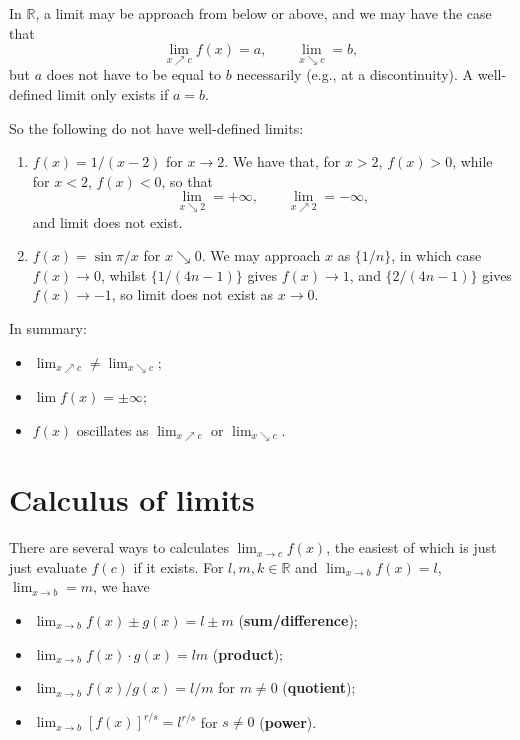 \documentclass[letter-paper]{tufte-book}
\newenvironment{example}[1][Example]{\begin{trivlist}
\item[\hskip \labelsep {\bfseries #1}]}{\end{trivlist}}
\newcommand\Def[1]{\textbf{#1}}
\begin{document}
In $\mathbb{R}$, a limit may be approach from below or above, and we may have 
the case that
\begin{equation*}
  \lim_{x\nearrow c}f(x)=a,\qquad \lim_{x\searrow c}=b,
\end{equation*}
but $a$ does not have to be equal to $b$ necessarily (e.g., at a discontinuity). 
A well-defined limit only exists if $a=b$.
\begin{example}
  So the following do not have well-defined limits:
  \begin{enumerate}
    \item $f(x)=1/(x-2)$ for $x\rightarrow2$. We have that, for $x>2$, $f(x)>0$, 
    while for $x<2$, $f(x)<0$, so that
    \begin{equation*}
      \lim_{x\searrow2}=+\infty,\qquad \lim_{x\nearrow2}=-\infty,
    \end{equation*}
    and limit does not exist.
    
    \item $f(x)=\sin\pi/x$ for $x\searrow0$. We may approach $x$ as $\{1/n\}$, 
    in which case $f(x)\rightarrow 0$, whilst $\{1/(4n-1)\}$ gives $f(x)
    \rightarrow 1$, and $\{2/(4n-1)\}$ gives $f(x)\rightarrow -1$, so limit does
    not exist as $x\rightarrow 0$.
  \end{enumerate}
\end{example}

In summary:
\begin{itemize}
  \item $\lim_{x\nearrow c}\neq \lim_{x\searrow c}$;
  \item $\lim f(x)=\pm\infty$;
  \item $f(x)$ oscillates as $\lim_{x\nearrow c}$ or $\lim_{x\searrow c}$.
\end{itemize}


\section{Calculus of limits}

There are several ways to calculates $\lim_{x\rightarrow c} f(x)$, the easiest 
of which is just just evaluate $f(c)$ if it exists. For $l,m,k\in\mathbb{R}$ and 
$\lim_{x\rightarrow b}f(x)=l$, $\lim_{x\rightarrow b}=m$, we have
\begin{itemize}
  \item $\lim_{x\rightarrow b}f(x)\pm g(x)=l\pm m$ (\Def{sum/difference});
  \item $\lim_{x\rightarrow b}f(x)\cdot g(x)=lm$ (\Def{product});
  \item $\lim_{x\rightarrow b}f(x)/g(x)=l/m$ for $m\neq0$ 
  (\Def{quotient});
  \item $\lim_{x\rightarrow b}[f(x)]^{r/s}=l^{r/s}$ for $s\neq 0$ 
  (\Def{power}).
\end{itemize}
\end{document}
